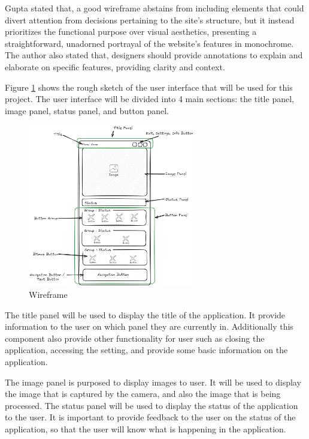Gupta \cite{Gupta_2023} stated that, a good wireframe abstains from including elements that could divert attention from decisions pertaining to the site's structure, but it instead prioritizes the functional purpose over visual aesthetics, presenting a straightforward, unadorned portrayal of the website's features in monochrome. The  author also stated that, designers should provide annotations to explain and elaborate on specific features, providing clarity and context.

Figure \ref{fig:wireframe} shows the rough sketch of the user interface that will be used for this project. The user interface will be divided into 4 main sections: the title panel, image panel, status panel, and button panel.

\begin{figure}[!ht]
    \centering
    \includegraphics[width=0.65\textwidth]{texs/Part2/chapter3/image/wireframe.png}
    \caption{Wireframe}
    \label{fig:wireframe}
\end{figure}

The title panel will be used to display the title of the application. It provide information to the user on which panel they are currently in. Additionally this component also provide other functionality for user such as closing the application, accessing the setting, and provide some basic information on the application.

The image panel is purposed to display images to user. It will be used to display the image that is captured by the camera, and also the image that is being processed. The status panel will be used to display the status of the application to the user. It is important to provide feedback to the user on the status of the application, so that the user will know what is happening in the application.

